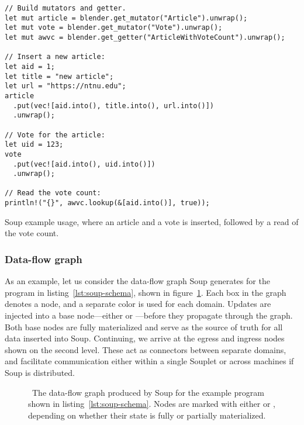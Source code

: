 \begin{listing}[H]
  \begin{verbatim}
// Build mutators and getter.
let mut article = blender.get_mutator("Article").unwrap();
let mut vote = blender.get_mutator("Vote").unwrap();
let mut awvc = blender.get_getter("ArticleWithVoteCount").unwrap();

// Insert a new article:
let aid = 1;
let title = "new article";
let url = "https://ntnu.edu";
article
  .put(vec![aid.into(), title.into(), url.into()])
  .unwrap();

// Vote for the article:
let uid = 123;
vote
  .put(vec![aid.into(), uid.into()])
  .unwrap();

// Read the vote count:
println!("{}", awvc.lookup(&[aid.into()], true));
  \end{verbatim}

  \caption{Soup example usage, where an article and a vote is inserted,
  followed by a read of the vote count.}\label{lst:soup-api}
\end{listing}

\subsubsection{Data-flow graph}

As an example, let us consider the data-flow graph Soup generates for the
program in listing~\ref{lst:soup-schema}, shown in
figure~\ref{fig:example-graph}. Each box in the graph denotes a node, and a
separate color is used for each domain. Updates are injected into a base
node---either  or ---before they propagate through the
graph. Both base nodes are fully materialized and serve as the source of truth
for all data inserted into Soup. Continuing, we arrive at the egress and ingress
nodes shown on the second level. These act as connectors between separate
domains, and facilitate communication either within a single Souplet or across
machines if Soup is distributed.

\begin{figure}[H]
  \centering
  
  \caption{\
    The data-flow graph produced by Soup for the example program shown in
    listing~\ref{lst:soup-schema}. Nodes are marked with either  or
    \code{(part.)}, depending on whether their state is fully or partially
    materialized.
  }\label{fig:example-graph}
\end{figure}

